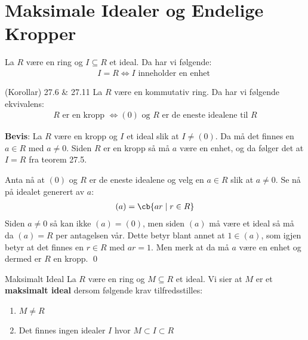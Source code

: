 \section{Maksimale Idealer og Endelige Kropper}

\begin{theorem*}{27.5}{}
	La $R$ være en ring og $I\subseteq R$ et ideal. Da har vi følgende:
	\begin{align}
		I=R \iff I \text{ inneholder en enhet }
	\end{align}
\end{theorem*}

\begin{theorem*}{(Korollar) 27.6 \& 27.11}{}
	La $R$ være en kommutativ ring. Da har vi følgende ekvivalens:
	\begin{align}
		R \text{ er en kropp } \iff (0)\text{ og }R\text{ er de eneste idealene til }R
	\end{align}
\end{theorem*}

\textbf{Bevis}:
La $R$ være en kropp og $I$ et ideal slik at $I\neq (0)$. Da må det finnes en $a\in R$
med $a\neq 0$. Siden $R$ er en kropp så må $a$ være en enhet, og da følger det at
$I=R$ fra teorem 27.5.

Anta nå at $(0)$ og $R$ er de eneste idealene og velg en $a\in R$ slik at $a\neq 0$.
Se nå på idealet generert av $a$:
\begin{align}
	(a)=\cb{ar\mid r\in R}
\end{align}
Siden $a\neq 0$ så kan ikke $(a)=(0)$, men siden $(a)$ må være et ideal så må da
$(a)=R$ per antagelsen vår. Dette betyr blant annet at $1\in (a)$, som igjen betyr at
det finnes en $r\in R$ med $ar=1$. Men merk at da må $a$ være en enhet og dermed er
$R$ en kropp. \qed

\begin{definition}{Maksimalt Ideal}{}
	La $R$ være en ring og $M\subseteq R$ et ideal. Vi sier at $M$ er et
	\textbf{maksimalt ideal} dersom følgende krav tilfredsstilles:
	\begin{enumerate}
		\item $M\neq R$
		\item Det finnes ingen idealer $I$ hvor $M\subset I\subset R$
	\end{enumerate}
\end{definition}

